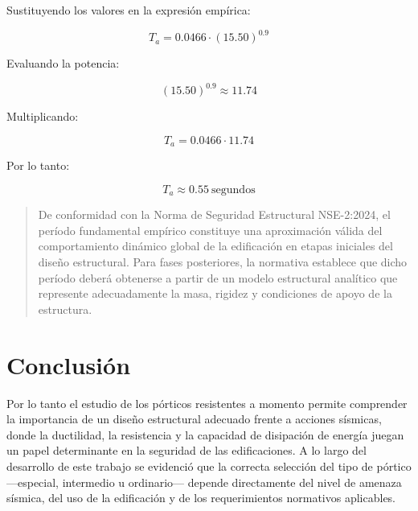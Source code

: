 \documentclass[14pt,letterpaper]{extarticle}
\begin{document}
	Sustituyendo los valores en la expresión empírica:
	
	\begin{equation}
		T_a = 0.0466 \cdot (15.50)^{0.9}
	\end{equation}
	
	Evaluando la potencia:
	
	\begin{equation}
		(15.50)^{0.9} \approx 11.74
	\end{equation}
	
	Multiplicando:
	
	\begin{equation}
		T_a = 0.0466 \cdot 11.74
	\end{equation}
	
	Por lo tanto:
	
	\begin{equation}
		\boxed{T_a \approx 0.55 \ \text{segundos}}
	\end{equation}
	

	
	
	
	\begin{quote}
		De conformidad con la Norma de Seguridad Estructural NSE-2:2024, el período fundamental empírico constituye una aproximación válida del comportamiento dinámico global de la edificación en etapas iniciales del diseño estructural. Para fases posteriores, la normativa establece que dicho período deberá obtenerse a partir de un modelo estructural analítico que represente adecuadamente la masa, rigidez y condiciones de apoyo de la estructura.
	\end{quote}
	

	
	

	
	

	
	
	
	
	
	
	
	
	
	
	
	
	
		\newpage
	

	\section{Conclusión}
	Por lo tanto el estudio de los pórticos resistentes a momento permite comprender la importancia de un diseño estructural adecuado frente a acciones sísmicas, donde la ductilidad, la resistencia y la capacidad de disipación de energía juegan un papel determinante en la seguridad de las edificaciones. A lo largo del desarrollo de este trabajo se evidenció que la correcta selección del tipo de pórtico —especial, intermedio u ordinario— depende directamente del nivel de amenaza sísmica, del uso de la edificación y de los requerimientos normativos aplicables. \\
	
\end{document}
